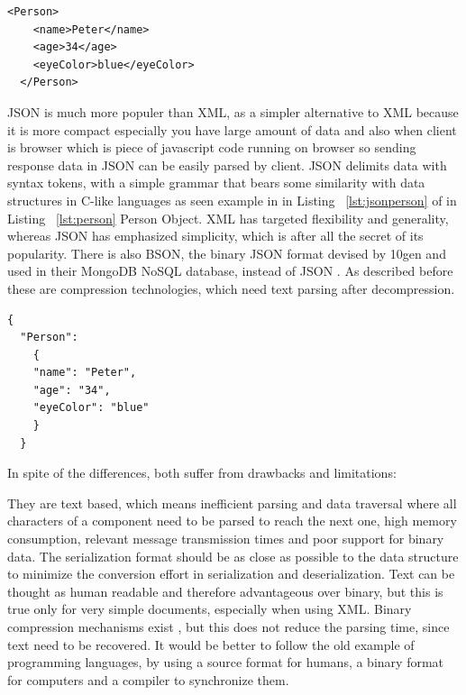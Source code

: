 \begin{lstlisting}[caption=JSON presentation of Person object, label=lst:xmlperson]
  <Person>
    <name>Peter</name>
    <age>34</age>
    <eyeColor>blue</eyeColor>
  </Person>
\end{lstlisting}
JSON is much more populer than XML\citep{thesis:state6}, as a simpler alternative to XML because it is more compact especially you have large amount of data and also when client is browser which is piece of javascript code running on browser so sending response data in JSON can be easily parsed by client. JSON delimits data with syntax tokens, with a simple grammar that bears some similarity with data structures in C-like languages as seen example in in Listing ~\ref{lst:jsonperson} of in Listing ~\ref{lst:person} Person Object. XML has targeted flexibility and generality, whereas JSON has emphasized simplicity, which is after all the secret of its popularity. There is also BSON, the binary JSON format devised by 10gen and used in their MongoDB NoSQL database, instead of JSON \citep{thesis:state8}. As described before these are compression technologies, which need text parsing after decompression.

\begin{lstlisting}[caption=JSON presentation of Person object, label=lst:jsonperson]
  {
  "Person":
    {
    "name": "Peter",
    "age": "34",
    "eyeColor": "blue"
    }
  }
\end{lstlisting}
In spite of the differences, both suffer from drawbacks and limitations:

They are text based, which means inefficient parsing and data traversal where all characters of a component need to be parsed to reach the next one, high memory consumption, relevant message transmission times and poor support for binary data. The serialization format should be as close as possible to the data structure to minimize the conversion effort in serialization and deserialization. Text can be thought as human readable and therefore advantageous over binary, but this is true only for very simple documents, especially when using XML. Binary compression mechanisms exist \citep{thesis:state5_3}\citep{thesis:state5_4}, but this does not reduce the parsing time, since text need to be recovered. It would be better to follow the old example of programming languages, by using a source format for humans, a binary format for computers and a compiler to synchronize them.\citep{thesis:state6}

